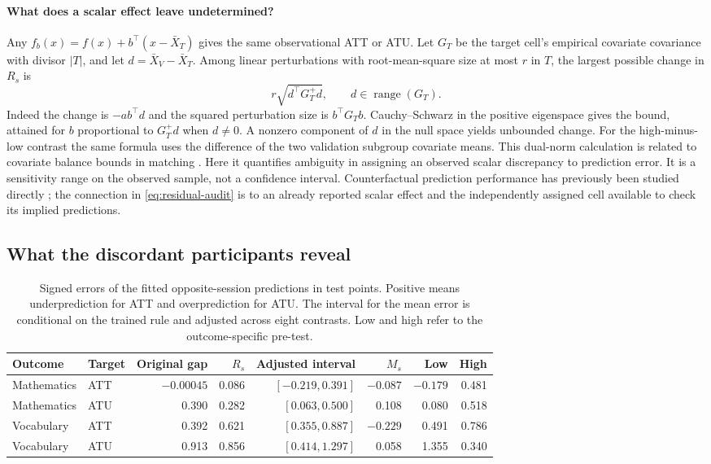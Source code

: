 \paragraph{What does a scalar effect leave undetermined?}
Any $f_b(x)=f(x)+b^\top(x-\bar X_T)$ gives the same observational ATT or ATU. Let $G_T$ be the target cell's empirical covariate covariance with divisor $|T|$, and let $d=\bar X_V-\bar X_T$. Among linear perturbations with root-mean-square size at most $r$ in $T$, the largest possible change in $R_s$ is
\begin{equation}
 r\sqrt{d^\top G_T^+d},\qquad d\in\operatorname{range}(G_T).
 \label{eq:shape-bound}
\end{equation}
Indeed the change is $-a b^\top d$ and the squared perturbation size is $b^\top G_T b$. Cauchy--Schwarz in the positive eigenspace gives the bound, attained for $b$ proportional to $G_T^+d$ when $d\ne0$. A nonzero component of $d$ in the null space yields unbounded change. For the high-minus-low contrast the same formula uses the difference of the two validation subgroup covariate means. This dual-norm calculation is related to covariate balance bounds in matching \citep{kallus2020}. Here it quantifies ambiguity in assigning an observed scalar discrepancy to prediction error. It is a sensitivity range on the observed sample, not a confidence interval. Counterfactual prediction performance has previously been studied directly \citep{boyer2025}; the connection in \eqref{eq:residual-audit} is to an already reported scalar effect and the independently assigned cell available to check its implied predictions.

\subsection{What the discordant participants reveal}

\begin{table}[htbp]
\centering\small
\caption{Signed errors of the fitted opposite-session predictions in test points. Positive means underprediction for ATT and overprediction for ATU. The interval for the mean error is conditional on the trained rule and adjusted across eight contrasts. Low and high refer to the outcome-specific pre-test.}
\label{tab:audit}\setlength{\tabcolsep}{4pt}
\begin{tabular}{llrrrrrr}
\toprule
Outcome & Target & Original gap & $R_s$ & Adjusted interval & $M_s$ & Low & High \\
\midrule
Mathematics & ATT & $-0.00045$ & 0.086 & $[-0.219,0.391]$ & $-0.087$ & $-0.179$ & 0.481 \\
Mathematics & ATU & 0.390 & 0.282 & $[0.063,0.500]$ & 0.108 & 0.080 & 0.518 \\
Vocabulary & ATT & 0.392 & 0.621 & $[0.355,0.887]$ & $-0.229$ & 0.491 & 0.786 \\
Vocabulary & ATU & 0.913 & 0.856 & $[0.414,1.297]$ & 0.058 & 1.355 & 0.340 \\
\bottomrule
\end{tabular}
\end{table}

